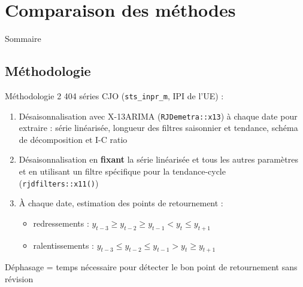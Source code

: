 \documentclass[10pt,xcolor=table,color={dvipsnames,usenames},ignorenonframetext,usepdftitle=false,french]{beamer}
\providecommand{\tightlist}{%
  \setlength{\parskip}{0pt}
  }
\newcommand\1{\mathds{1}}
\begin{document}
\hypertarget{comparaison-des-muxe9thodes}{%
\section{Comparaison des méthodes}\label{comparaison-des-muxe9thodes}}

\begin{frame}{Sommaire}
\protect\hypertarget{sommaire-1}{}
\end{frame}

\hypertarget{muxe9thodologie}{%
\subsection{Méthodologie}\label{muxe9thodologie}}

\begin{frame}[fragile]{Méthodologie}
\protect\hypertarget{muxe9thodologie-1}{}
2 404 séries CJO (\texttt{sts\_inpr\_m}, IPI de l'UE) :

\begin{enumerate}
\tightlist
\item
  Désaisonnalisation avec X-13ARIMA (\texttt{RJDemetra::x13}) à chaque
  date pour extraire : série linéarisée, longueur des filtres saisonnier
  et tendance, schéma de décomposition et I-C ratio
\end{enumerate}

\pause

\begin{enumerate}
\setcounter{enumi}{1}
\tightlist
\item
  Désaisonnalisation en \textbf{fixant} la série linéarisée et tous les
  autres paramètres et en utilisant un filtre spécifique pour la
  tendance-cycle (\texttt{rjdfilters::x11()})
\end{enumerate}

\pause

\begin{enumerate}
\setcounter{enumi}{2}
\item
  À chaque date, estimation des points de retournement :

  \begin{itemize}
  \item
    redressements : \(y_{t-3}\geq y_{t-2}\geq y_{t-1}<y_t\leq y_{t+1}\)
  \item
    ralentissements :
    \(y_{t-3}\leq y_{t-2}\leq y_{t-1}>y_t\geq y_{t+1}\)
  \end{itemize}
\end{enumerate}

\pause

Déphasage = temps nécessaire pour détecter le bon point de retournement
sans révision
\end{frame}
\end{document}
